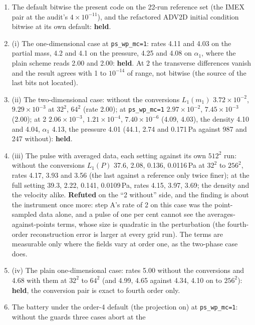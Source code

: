 \documentclass[11pt,a4paper]{article}
\newcommand{\code}[1]{\texttt{\small #1}}
\begin{document}
\begin{enumerate}[nosep]
\item The default bitwise the present code on the 22-run reference set
      (the IMEX pair at the audit's $4\times10^{-11}$), and the refactored
      ADV2D initial condition bitwise at its own default: \textbf{held}.
\item (i) The one-dimensional case at \code{ps\_wp\_mc=1}: rates 4.11
      and 4.03 on the partial mass, 4.2 and 4.1 on the pressure, 4.25
      and 4.08 on $\alpha_1$, where the plain scheme reads 2.00 and 2.00:
      \textbf{held}.  At 2 the transverse differences vanish and the
      result agrees with 1 to $10^{-14}$ of range, not bitwise (the
      source of the last bits not located).
\item (ii) The two-dimensional case: without the conversions $L_1(m_1)$ $3.72\times10^{-2}$,
      $9.29\times10^{-3}$ at $32^2$, $64^2$ (rate 2.00); at
      \code{ps\_wp\_mc=1} $2.97\times10^{-2}$, $7.45\times10^{-3}$ (2.00);
      at 2 $2.06\times10^{-3}$, $1.21\times10^{-4}$, $7.40\times10^{-6}$
      (4.09, 4.03), the density 4.10 and 4.04, $\alpha_1$ 4.13, the
      pressure 4.01 (44.1, 2.74 and 0.171\,Pa against 987 and 247
      without): \textbf{held}.
\item (iii) The pulse with averaged data, each setting against its own
      $512^2$ run: without the conversions $L_1(P)$ 37.6, 2.08, 0.136,
      0.0116\,Pa at $32^2$ to $256^2$, rates 4.17, 3.93 and 3.56 (the last
      against a reference only twice finer); at the full setting 39.3,
      2.22, 0.141, 0.0109\,Pa, rates 4.15, 3.97, 3.69; the density and
      the velocity alike.  \textbf{Refuted} on the ``2 without'' side,
      and the finding is about the instrument once more: step A's rate
      of 2 on this case was the point-sampled data alone, and a pulse of
      one per cent cannot see the averages-against-points terms, whose
      size is quadratic in the perturbation (the fourth-order
      reconstruction error is larger at every grid run).  The terms are
      measurable only where the fields vary at order one, as the
      two-phase case does.
\item (iv) The plain one-dimensional case: rates 5.00 without the
      conversions and 4.68 with them at $32^2$ to $64^2$ (and 4.99, 4.65 against 4.34, 4.10 on to $256^2$):
      \textbf{held}, the conversion pair is exact to fourth order only.
\item The battery under the order-4 default (the projection on) at
      \code{ps\_wp\_mc=1}: without the guards three cases abort at the

\end{enumerate}
\end{document}
